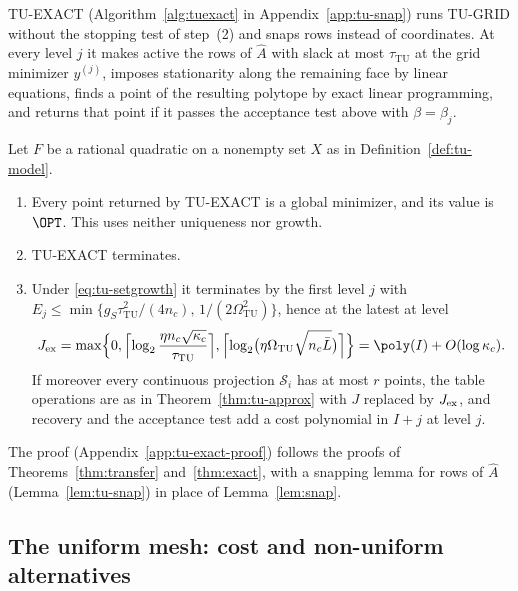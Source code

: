 TU-EXACT (Algorithm~\ref{alg:tuexact} in Appendix~\ref{app:tu-snap}) runs
TU-GRID without the stopping test of step~(2) and snaps rows instead of
coordinates. At every level $j$ it makes active the rows of $\hat A$ with
slack at most $\tau_{\mathrm{TU}}$ at the grid minimizer $y^{(j)}$, imposes
stationarity along the remaining face by linear equations, finds a point of
the resulting polytope by exact linear programming, and returns that point
if it passes the acceptance test above with $\beta=\beta_j$.

\begin{theorem}\label{thm:tu-exact}
Let $F$ be a rational quadratic on a nonempty set $X$ as in
Definition~\ref{def:tu-model}.
\begin{enumerate}[label=(\alph*)]
\item Every point returned by TU-EXACT is a global minimizer, and its value
is $\OPT$. This uses neither uniqueness nor growth.
\item TU-EXACT terminates.
\item Under \eqref{eq:tu-setgrowth} it terminates by the first level $j$ with
$E_j\le\min\{g_S\tau_{\mathrm{TU}}^2/(4n_c),\,1/(2\Omega_{\mathrm{TU}}^2)\}$,
hence at the latest at level
\[
J_{\rm ex}=\max\Bigl\{0,\Bigl\lceil\log_2\frac{\eta n_c\sqrt{\kappa_c}}{\tau_{\mathrm{TU}}}\Bigr\rceil,
\Bigl\lceil\log_2\bigl(\eta\Omega_{\mathrm{TU}}\sqrt{n_c\bar L}\bigr)\Bigr\rceil\Bigr\}
=\poly(I)+O(\log\kappa_c).
\]
If moreover every continuous projection $\mathcal S_i$ has at most
$r$ points, the table operations are as in Theorem~\ref{thm:tu-approx} with
$J$ replaced by $J_{\rm ex}$, and recovery and the acceptance test add a cost
polynomial in $I+j$ at level $j$.
\end{enumerate}
\end{theorem}

The proof (Appendix~\ref{app:tu-exact-proof}) follows the proofs of
Theorems~\ref{thm:transfer} and~\ref{thm:exact}, with a snapping lemma for
rows of $\hat A$ (Lemma~\ref{lem:tu-snap}) in place of
Lemma~\ref{lem:snap}.

\subsection{The uniform mesh: cost and non-uniform alternatives}\label{sec:tu-limits}

